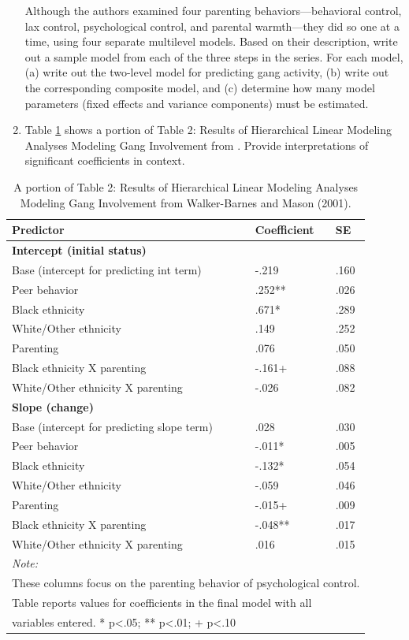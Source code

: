 \documentclass[
]{krantz}
\begin{document}
\begin{enumerate}
  Although the authors examined four parenting behaviors---behavioral control, lax control, psychological control, and parental warmth---they did so one at a time, using four separate multilevel models. Based on their description, write out a sample model from each of the three steps in the series. For each model, (a) write out the two-level model for predicting gang activity, (b) write out the corresponding composite model, and (c) determine how many model parameters (fixed effects and variance components) must be estimated.
\item
  Table \ref{tab:table4chp9} shows a portion of Table 2: Results of Hierarchical Linear Modeling Analyses Modeling Gang Involvement from \citet{Walker-Barnes2001}. Provide interpretations of significant coefficients in context.
\end{enumerate}

\begin{table}

\caption{\label{tab:table4chp9}A portion of Table 2: Results of Hierarchical Linear Modeling Analyses Modeling Gang Involvement from Walker-Barnes and Mason (2001).}
\centering
\begin{tabular}[t]{lll}
\toprule
Predictor & Coefficient & SE\\
\midrule
\textbf{Intercept (initial status)} & \textbf{} & \textbf{}\\
Base (intercept for predicting int term) & -.219 & .160\\
Peer behavior & .252** & .026\\
Black ethnicity & .671* & .289\\
White/Other ethnicity & .149 & .252\\
\addlinespace
Parenting & .076 & .050\\
Black ethnicity X parenting & -.161+ & .088\\
White/Other ethnicity X parenting & -.026 & .082\\
\textbf{Slope (change)} & \textbf{} & \textbf{}\\
Base (intercept for predicting slope term) & .028 & .030\\
\addlinespace
Peer behavior & -.011* & .005\\
Black ethnicity & -.132* & .054\\
White/Other ethnicity & -.059 & .046\\
Parenting & -.015+ & .009\\
Black ethnicity X parenting & -.048** & .017\\
\addlinespace
White/Other ethnicity X parenting & .016 & .015\\
\bottomrule
\multicolumn{3}{l}{\textit{Note: }}\\
\multicolumn{3}{l}{These columns focus on the parenting behavior of psychological control.}\\
\multicolumn{3}{l}{Table reports values for coefficients in the final model with all}\\
\multicolumn{3}{l}{variables entered.  * p<.05; ** p<.01; + p<.10}\\
\end{tabular}
\end{table}
\end{document}
